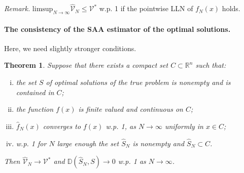 \documentclass[a4pper,11pt]{article}
\newtheorem{thm}{Theorem}[section]
\begin{document}
 
 
 
 \textit{Remark.} $\text{limsup}_{N\to \infty}\hat{\mathcal V}_N\leq \mathcal V^*$ w.p. 1 if the pointwise LLN of $f_N(x)$ holds.
 \paragraph{The consistency of the SAA estimator of the optimal solutions.}
 Here, we need slightly stronger conditions.
 \begin{thm}
 Suppose that there exists a compact set $C\subset \mathbb R^n$ such that:
 \begin{enumerate}[(i)]
 	\item the set $S$ of optimal solutions of the true problem is nonempty and is contained in $C$;
	\item the function $f(x)$ is finite valued and continuous on $C$;
	\item $\hat f_N(x)$ converges to $f(x)$ w.p. 1, as $N\to \infty$ uniformly in $x\in C$;
	\item w.p. 1 for $N$ large enough the set $\hat S_N$ is nonempty and $\hat S_N\subset C$.
 \end{enumerate}
 Then $\hat {\mathcal V}_N\to \mathcal V^*$ and $\mathbb D(\hat S_N,S)\to 0$ w.p. 1 as $N\to \infty$.
 \label{5.3}
 \end{thm}
\end{document}
